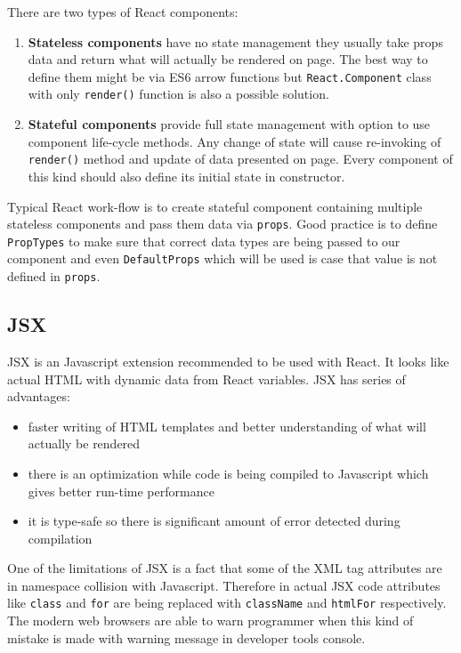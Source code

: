 There are two types of React components\cite{React}:
\begin{enumerate}
\item \textbf{Stateless components} have no state management they usually take props data and return what will actually be rendered on page. The best way to define them might be via ES6 arrow functions\cite{arrowFunctions} but \texttt{React.Component} class with only \texttt{render()} function is also a possible solution.

\item \textbf{Stateful components} provide full state management with option to use component life-cycle methods. Any change of state will cause re-invoking of \texttt{render()} method and update of data presented on page. Every component of this kind should also define its initial state in constructor.
\end{enumerate}

Typical React work-flow is to create stateful component containing multiple stateless components and pass them data via \texttt{props}. Good practice is to define \texttt{PropTypes} to make sure that correct data types are being passed to our component and even \texttt{DefaultProps} which will be used is case that value is not defined in \texttt{props}. 

\subsection{JSX} 
JSX\cite{JSX} is an Javascript extension recommended to be used with React. It looks like actual HTML with dynamic data from React variables. JSX has series of advantages:
\begin{itemize}
\item faster writing of HTML templates and better understanding of what will actually be rendered
\item there is an optimization while code is being compiled to Javascript which gives better run-time performance
\item it is type-safe so there is significant amount of error detected during compilation
\end{itemize}  

One of the limitations of JSX is a fact that some of the XML tag attributes are in namespace collision with Javascript. Therefore in actual JSX code attributes like \texttt{class} and \texttt{for} are being replaced with \texttt{className} and \texttt{htmlFor} respectively. The modern web browsers are able to warn programmer when this kind of mistake is made with warning message in developer tools console. 

